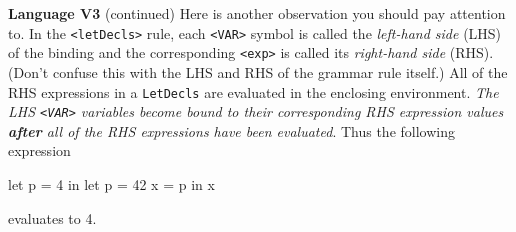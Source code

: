 \begin{minipage}[t]{\sw}
\slidenumber
\LARGE
{\bf Language V3} (continued)\exx
{\large
\emm{}
\exx
}
Here is another observation you should pay attention to.
In the \verb'<letDecls>' rule, each \verb'<VAR>' symbol
is called the {\em left-hand side} (LHS) of the binding
and the corresponding \verb'<exp>'
is called its {\em right-hand side} (RHS).
(Don't confuse this with the LHS and RHS of the grammar rule itself.)
All of the RHS expressions in a \verb'LetDecls' are evaluated
in the enclosing environment.
{\em The LHS \verb'<VAR>' variables become bound
to their corresponding RHS expression values
{\bf after} all of the RHS expressions have been evaluated}.
Thus the following expression
\begin{qv}
let p = 4
in
  let
    p = 42
    x = p
  in
    x
\end{qv}
evaluates to 4.
\end{minipage}
\clearpage
